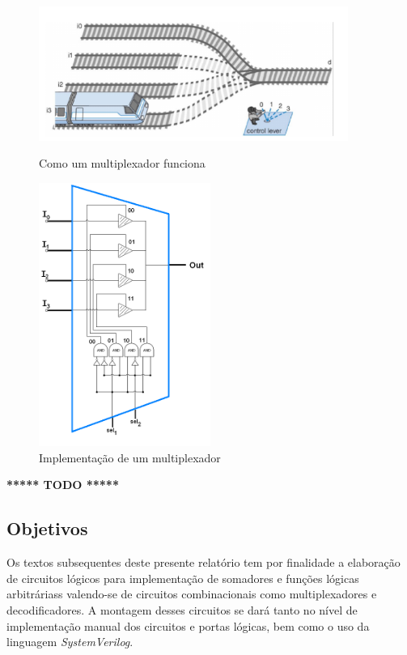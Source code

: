 \documentclass[12pt]{article}
\begin{document}
\begin{figure}[H]
    \centering
    \begin{minipage}{0.45\textwidth}
      \centering
      \includegraphics[width=0.9\textwidth]{Exp06/Images/mux.png}
      \caption{Como um multiplexador funciona}\label{fig:mux.png}
    \end{minipage}\hfill
    \begin{minipage}{0.45\textwidth}
      \centering
      \includegraphics[width=0.5\textwidth]{Exp06/Images/mux_wiki.png}
      \caption{Implementação de um multiplexador}\label{fig:mux_wiki.png}
    \end{minipage}\hfill
\end{figure}

\textbf{***** TODO *****}

\subsection{Objetivos}
\label{sec:Objetivos}

Os textos subsequentes deste presente relatório tem por finalidade a elaboração
de circuitos lógicos para implementação de somadores e funções lógicas
arbitráriass valendo-se de circuitos combinacionais como multiplexadores e
decodificadores. A montagem desses circuitos se dará tanto no nível de
implementação manual dos circuitos e portas lógicas, bem como o uso da linguagem
\emph{SystemVerilog}.
\end{document}
